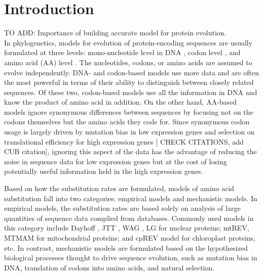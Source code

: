 \section{Introduction}

TO ADD: Importance of building accurate model for protein evolution. \\

In phylogenetics, models for evolution of protein-encoding sequences are usually formulated at three levels: mono-nucleotide level in DNA \citep[e.g., see][]{jukes1969evolution, kimura1980, felsenstein1981evolutionary, hasegawa1985dating}, codon level \citep[see][]{GoldmanYang1994,muse1994,yang1998models,yang2008mutation}, and amino acid (AA) level \citep[see][]{kishino1990maximum}.
The nucleotides, codons, or amino acids are assumed to evolve independently.
DNA- and codon-based models use more data and are often the most powerful in terms of their ability to distinguish between closely related sequences. 
Of these two, codon-based models use all the information in DNA and know the product of amino acid in addition. On the other hand, AA-based models ignore synonymous differences between sequences by focusing not on the codons themselves but the amino acids they code for. 
Since synonymous codon usage is largely driven by mutation bias in low expression genes and selection on translational efficiency for high expression genes \citep[see][]{Gilchrist2007}[{\color{blue} CHECK CITATIONS, add CUB citation}], ignoring this aspect of the data has the advantage of reducing the noise in sequence data for low expression genes but at the cost of losing potentially useful information held in the high expression genes.

Based on how the substitution rates are formulated, models of amino acid substitution fall into two categories: empirical models and mechanistic models. 
In empirical models, the substitution rates are based solely on analysis of large quantities of sequence data complied from databases.
Commonly used models in this category include  Dayhoff \citep{dayhoff1978model}, JTT \citep{jones1992rapid}, WAG \citep{whelan2001general}, LG \citep{lg2008improved} for nuclear proteins; mtREV, MTMAM \citep{adachi1996model, yang1998models} for mitochondrial proteins; and cpREV \citep{adachi2000plastid} model for chloroplast proteins, etc. \citep[see][]{cao1994phylogenetic, henikoff1992amino, gonnet1992exhaustive} 
In contrast, mechanistic models are formulated based on the hypothesized biological processes thought to drive sequence evolution, such as mutation bias in DNA, translation of codons into amino acids, and natural selection.

